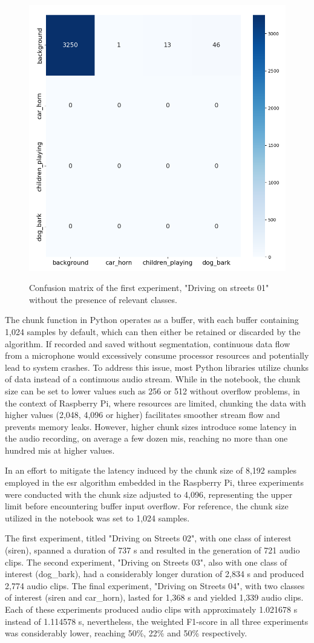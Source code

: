 \begin{figure}[htbp]
    \raggedright
        \caption{Confusion matrix of the first experiment, "Driving on streets 01" without the presence of relevant classes.}
        \includegraphics[width=.5\textwidth]{resources/images/060-results/Results_evaluation_driving_streets_01.png}
        \label{fig:Results_evaluation_driving_streets_01}
\end{figure}

The chunk function in Python operates as a buffer, with each buffer containing 1,024 samples by default, which can then either be retained or discarded by the algorithm. If recorded and saved without segmentation, continuous data flow from a microphone would excessively consume processor resources and potentially lead to system crashes. To address this issue, most Python libraries utilize chunks of data instead of a continuous audio stream. While in the notebook, the chunk size can be set to lower values such as 256 or 512 without overflow problems, in the context of Raspberry Pi, where resources are limited, chunking the data with higher values (2,048, 4,096 or higher) facilitates smoother stream flow and prevents memory leaks. However, higher chunk sizes introduce some latency in the audio recording, on average a few dozen \gls{mi}\gls{s}, reaching no more than one hundred \gls{mi}\gls{s} at higher values.

In an effort to mitigate the latency induced by the chunk size of 8,192 samples employed in the \gls{esr} algorithm embedded in the Raspberry Pi, three experiments were conducted with the chunk size adjusted to 4,096, representing the upper limit before encountering buffer input overflow. For reference, the chunk size utilized in the notebook was set to 1,024 samples. 

The first experiment, titled "Driving on Streets 02", with one class of interest (siren), spanned a duration of 737 \gls{s} and resulted in the generation of 721 audio clips. The second experiment, "Driving on Streets 03", also with one class of interest (dog\_bark), had a considerably longer duration of 2,834 \gls{s} and produced 2,774 audio clips. The final experiment, "Driving on Streets 04", with two classes of interest (siren and car\_horn), lasted for 1,368 \gls{s} and yielded 1,339 audio clips. Each of these experiments produced audio clips with approximately 1.021678 \gls{s} instead of 1.114578 \gls{s}, nevertheless, the weighted F1-score in all three experiments was considerably lower, reaching 50\%, 22\% and 50\% respectively.

